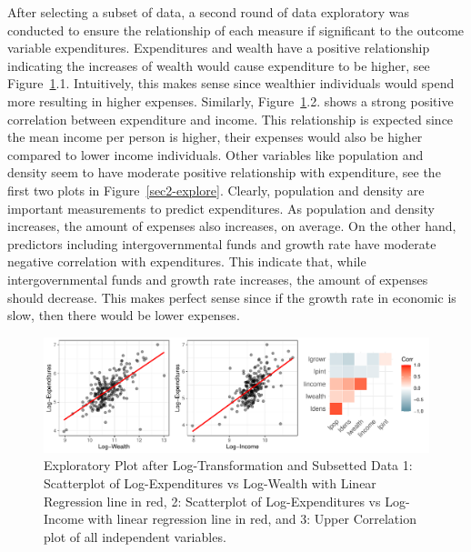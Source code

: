 \documentclass[11pt]{article}\usepackage[]{graphicx}\usepackage[]{color}
\makeatletter
\def\maxwidth{ %
  \ifdim\Gin@nat@width>\linewidth
    \linewidth
  \else
    \Gin@nat@width
  \fi
}
\makeatother
\begin{document}
\noindent After selecting a subset of data, a second round of data exploratory was conducted to ensure the relationship of each measure if significant to the outcome variable expenditures. Expenditures and wealth have a positive relationship indicating the increases of wealth would cause expenditure to be higher, see Figure~\ref{sec-explore}.1. Intuitively, this makes sense since wealthier individuals would spend more resulting in higher expenses. Similarly, Figure~\ref{sec-explore}.2. shows a strong positive correlation between expenditure and income. This relationship is expected since the mean income per person is higher, their expenses would also be higher compared to lower income individuals. Other variables like population and density seem to have moderate positive relationship with expenditure, see the first two plots in Figure~\ref{sec2-explore}. Clearly, population and density are important measurements to predict expenditures. As population and density increases, the amount of expenses also increases, on average. On the other hand, predictors including intergovernmental funds and growth rate have moderate negative correlation with expenditures. This indicate that, while intergovernmental funds and growth rate increases, the amount of expenses should decrease. This makes perfect sense since if the growth rate in economic is slow, then there would be lower expenses.             

\begin{figure}[h!] 
\begin{center}

\includegraphics[width=\maxwidth]{figure/unnamed-chunk-3-1} 

\caption{Exploratory Plot after Log-Transformation and Subsetted Data 1: Scatterplot of Log-Expenditures vs Log-Wealth with Linear Regression line in red, 2: Scatterplot of Log-Expenditures vs Log-Income with linear regression line in red, and 3: Upper Correlation plot of all independent variables.}
\label{sec-explore}
\end{center} 
\end{figure}
\end{document}
